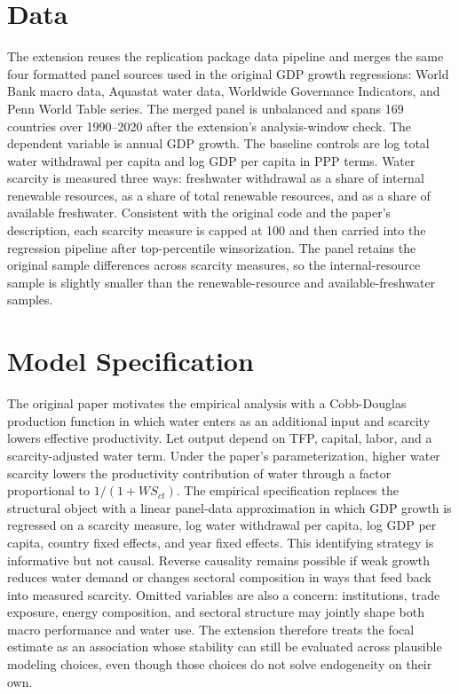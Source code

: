 \documentclass[11pt]{article}
\begin{document}
\section{Data}
The extension reuses the replication package data pipeline and merges the same four formatted panel sources used in the original GDP growth regressions: World Bank macro data, Aquastat water data, Worldwide Governance Indicators, and Penn World Table series. The merged panel is unbalanced and spans 169 countries over 1990--2020 after the extension's analysis-window check. The dependent variable is annual GDP growth. The baseline controls are log total water withdrawal per capita and log GDP per capita in PPP terms.
Water scarcity is measured three ways: freshwater withdrawal as a share of internal renewable resources, as a share of total renewable resources, and as a share of available freshwater. Consistent with the original code and the paper's description, each scarcity measure is capped at 100 and then carried into the regression pipeline after top-percentile winsorization. The panel retains the original sample differences across scarcity measures, so the internal-resource sample is slightly smaller than the renewable-resource and available-freshwater samples.
\section{Model Specification}
The original paper motivates the empirical analysis with a Cobb-Douglas production function in which water enters as an additional input and scarcity lowers effective productivity. Let output depend on TFP, capital, labor, and a scarcity-adjusted water term. Under the paper's parameterization, higher water scarcity lowers the productivity contribution of water through a factor proportional to $1/(1+WS_{ct})$. The empirical specification replaces the structural object with a linear panel-data approximation in which GDP growth is regressed on a scarcity measure, log water withdrawal per capita, log GDP per capita, country fixed effects, and year fixed effects.
This identifying strategy is informative but not causal. Reverse causality remains possible if weak growth reduces water demand or changes sectoral composition in ways that feed back into measured scarcity. Omitted variables are also a concern: institutions, trade exposure, energy composition, and sectoral structure may jointly shape both macro performance and water use. The extension therefore treats the focal estimate as an association whose stability can still be evaluated across plausible modeling choices, even though those choices do not solve endogeneity on their own.
\end{document}
